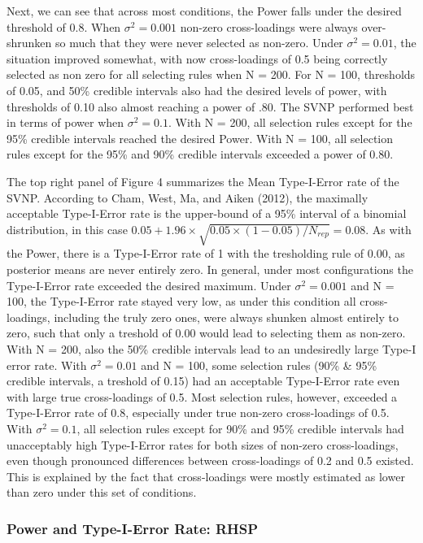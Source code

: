 \documentclass[
  man, donotrepeattitle,floatsintext]{apa6}
\begin{document}
Next, we can see that across most conditions, the Power falls under the desired threshold of 0.8. When \(\sigma^2 = 0.001\) non-zero cross-loadings were always over-shrunken so much that they were never selected as non-zero. Under \(\sigma^2 = 0.01\), the situation improved somewhat, with now cross-loadings of 0.5 being correctly selected as non zero for all selecting rules when N = 200. For N = 100, thresholds of 0.05, and 50\% credible intervals also had the desired levels of power, with thresholds of 0.10 also almost reaching a power of .80. The SVNP performed best in terms of power when \(\sigma^2 = 0.1\). With N = 200, all selection rules except for the 95\% credible intervals reached the desired Power. With N = 100, all selection rules except for the 95\% and 90\% credible intervals exceeded a power of 0.80.

The top right panel of Figure 4 summarizes the Mean Type-I-Error rate of the SVNP. According to Cham, West, Ma, and Aiken (2012), the maximally acceptable Type-I-Error rate is the upper-bound of a 95\% interval of a binomial distribution, in this case \(0.05 + 1.96 \times \sqrt{0.05 \times (1-0.05)/ N_{rep}} = 0.08\). As with the Power, there is a Type-I-Error rate of 1 with the tresholding rule of 0.00, as posterior means are never entirely zero. In general, under most configurations the Type-I-Error rate exceeded the desired maximum. Under \(\sigma^2 = 0.001\) and N = 100, the Type-I-Error rate stayed very low, as under this condition all cross-loadings, including the truly zero ones, were always shunken almost entirely to zero, such that only a treshold of 0.00 would lead to selecting them as non-zero. With N = 200, also the 50\% credible intervals lead to an undesiredly large Type-I error rate. With \(\sigma^2 = 0.01\) and N = 100, some selection rules (90\% \& 95\% credible intervals, a treshold of 0.15) had an acceptable Type-I-Error rate even with large true cross-loadings of 0.5. Most selection rules, however, exceeded a Type-I-Error rate of 0.8, especially under true non-zero cross-loadings of 0.5. With \(\sigma^2 = 0.1\), all selection rules except for 90\% and 95\% credible intervals had unacceptably high Type-I-Error rates for both sizes of non-zero cross-loadings, even though pronounced differences between cross-loadings of 0.2 and 0.5 existed. This is explained by the fact that cross-loadings were mostly estimated as lower than zero under this set of conditions.

\hypertarget{power-and-type-i-error-rate-rhsp}{%
\subsubsection{Power and Type-I-Error Rate: RHSP}\label{power-and-type-i-error-rate-rhsp}}
\end{document}
